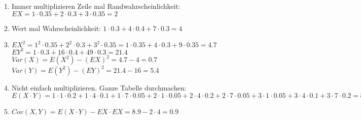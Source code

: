 \begin{enumerate}
\item Immer multiplizieren Zeile mal Randwahrscheinlichkeit: $ EX = 1\cdot 0.35 + 2\cdot 0.3 + 3\cdot 0.35 = 2$
\item Wert mal Wahrscheinlichkeit: $ 1\cdot 0.3 + 4\cdot 0.4 + 7\cdot 0.3 = 4$
\item $EX^2 = 1^2 \cdot 0.35 + 2^2\cdot 0.3 + 3^2\cdot 0.35 = 1\cdot 0.35 + 4\cdot 0.3 + 9\cdot 0.35 = 4.7$\\
$EY^2 = 1\cdot 0.3 + 16\cdot 0.4 + 49\cdot 0.3 = 21.4 $\\
$Var(X) = E(X^2) - (EX)^2 = 4.7 - 4 = 0.7$\\
$Var(Y) = E(Y^2) - (EY)^2 = 21.4 - 16 = 5.4$\\
\item Nicht einfach multiplizieren. Ganze Tabelle durchmachen: $ E(X\cdot Y) = 
1\cdot 1\cdot 0.2 + 
1\cdot 4\cdot 0.1 + 
1\cdot 7\cdot 0.05 + 
2\cdot 1\cdot 0.05 + 
2\cdot 4\cdot 0.2 + 
2\cdot 7\cdot 0.05 + 
3\cdot 1\cdot 0.05 + 
3\cdot 4\cdot 0.1 + 
3\cdot 7\cdot 0.2 = 8.9
$
\item $ Cov(X,Y) = E(X\cdot Y) - EX\cdot EX = 8.9 - 2 \cdot 4 = 0.9$
\end{enumerate}